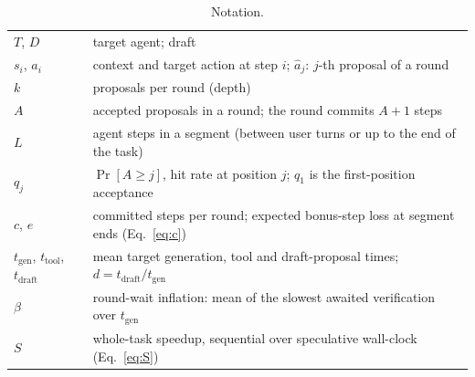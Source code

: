 \begin{table}[t]
\centering
\caption{Notation.}
\label{tab:notation}
\small
\begin{tabular}{ll}
\toprule
$T$, $D$ & target agent; draft \\
$s_i$, $a_i$ & context and target action at step $i$; $\hat a_j$: $j$-th proposal of a round \\
$k$ & proposals per round (depth) \\
$A$ & accepted proposals in a round; the round commits $A{+}1$ steps \\
$L$ & agent steps in a segment (between user turns or up to the end of the task) \\
$q_j$ & $\Pr[A \ge j]$, hit rate at position $j$; $q_1$ is the first-position acceptance \\
$c$, $e$ & committed steps per round; expected bonus-step loss at segment ends (Eq.~\ref{eq:c}) \\
$t_{\mathrm{gen}}$, $t_{\mathrm{tool}}$, $t_{\mathrm{draft}}$ & mean target generation, tool and draft-proposal times; $d = t_{\mathrm{draft}}/t_{\mathrm{gen}}$ \\
$\beta$ & round-wait inflation: mean of the slowest awaited verification over $t_{\mathrm{gen}}$ \\
$S$ & whole-task speedup, sequential over speculative wall-clock (Eq.~\ref{eq:S}) \\
\bottomrule
\end{tabular}
\end{table}

